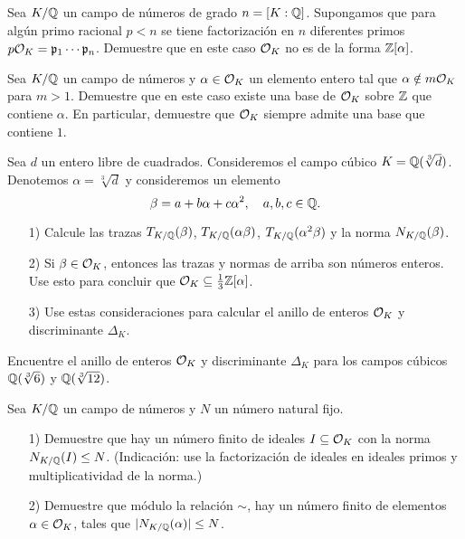 \begin{ejercicio}
  Sea $K/\mathbb{Q}$ un campo de números de grado $n = [K : \mathbb{Q}]$. Supongamos que para
  algún primo racional $p < n$ se tiene factorización en $n$ diferentes primos
  $p\mathcal{O}_K = \mathfrak{p}_1 \cdots \mathfrak{p}_n$. Demuestre que en este caso
  $\mathcal{O}_K$ no es de la forma $\mathbb{Z} [\alpha]$.
\end{ejercicio}

\begin{ejercicio}
  Sea $K/\mathbb{Q}$ un campo de números y $\alpha \in \mathcal{O}_K$ un elemento entero tal que
  $\alpha \notin m \mathcal{O}_K$ para $m > 1$. Demuestre que en este caso
  existe una base de $\mathcal{O}_K$ sobre $\mathbb{Z}$ que contiene $\alpha$. En particular,
  demuestre que $\mathcal{O}_K$ siempre admite una base que contiene $1$.
\end{ejercicio}

\begin{ejercicio}
  \label{ejerc:anillo-de-enteros-cubico}
  Sea $d$ un entero libre de cuadrados. Consideremos el campo cúbico
  $K = \mathbb{Q} (\sqrt[3]{d})$. Denotemos $\alpha = \sqrt[3]{d}$ y consideremos
  un elemento
  $$\beta = a + b\alpha + c\alpha^2, \quad a,b,c \in \mathbb{Q}.$$

  \begin{enumerate}
  \item[1)] Calcule las trazas
    $T_{K/\mathbb{Q}} (\beta)$, $T_{K/\mathbb{Q}} (\alpha\beta)$, $T_{K/\mathbb{Q}} (\alpha^2\beta)$
    y la norma $N_{K/\mathbb{Q}} (\beta)$.

  \item[2)] Si $\beta \in \mathcal{O}_K$, entonces las trazas y normas de arriba son
    números enteros. Use esto para concluir que
    $\mathcal{O}_K  \subseteq \frac{1}{3} \mathbb{Z} [\alpha]$.

  \item[3)] Use estas consideraciones para calcular el anillo de enteros $\mathcal{O}_K$
    y discriminante $\Delta_K$.
  \end{enumerate}
\end{ejercicio}

\begin{ejercicio}
  Encuentre el anillo de enteros $\mathcal{O}_K$ y discriminante $\Delta_K$ para
  los campos cúbicos $\mathbb{Q} (\sqrt[3]{6})$ y $\mathbb{Q} (\sqrt[3]{12})$.
\end{ejercicio}

\begin{ejercicio}
  Sea $K/\mathbb{Q}$ un campo de números y $N$ un número natural fijo.

  \begin{enumerate}
  \item[1)] Demuestre que hay un número finito de ideales $I \subseteq \mathcal{O}_K$ con
    la norma $N_{K/\mathbb{Q}} (I) \le N$.
    \noindent (Indicación: use la factorización de ideales en ideales primos y
    multiplicatividad de la norma.)

  \item[2)] Demuestre que módulo la relación $\sim$, hay un número finito
    de elementos $\alpha \in \mathcal{O}_K$, tales que $|N_{K/\mathbb{Q}} (\alpha)| \le N$.
  \end{enumerate}
\end{ejercicio}

